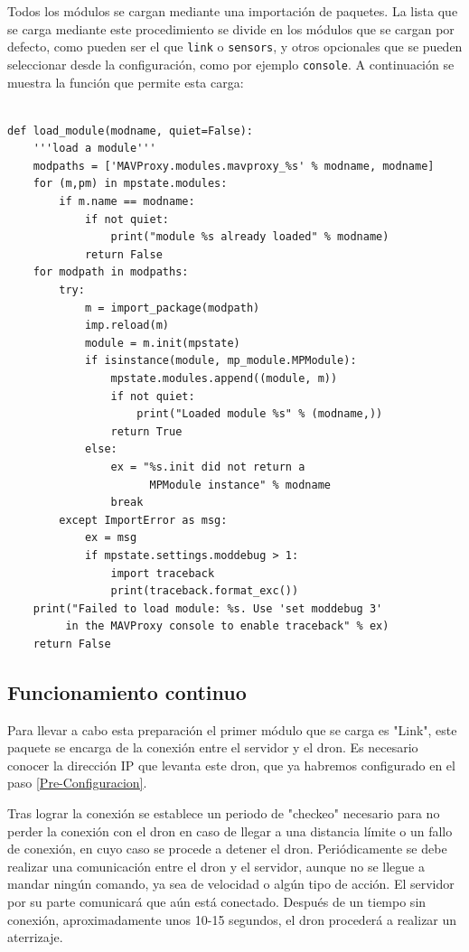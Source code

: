 Todos los módulos se cargan mediante una importación de paquetes. La lista que se carga mediante este procedimiento se divide en los módulos que se cargan por defecto, como pueden ser el que \texttt{link} o \texttt{sensors}, y otros opcionales que se pueden seleccionar desde la configuración, como por ejemplo \texttt{console}. A continuación se muestra la función que permite esta carga:
\begin{lstlisting}[frame=single]

def load_module(modname, quiet=False):
    '''load a module'''
    modpaths = ['MAVProxy.modules.mavproxy_%s' % modname, modname]
    for (m,pm) in mpstate.modules:
        if m.name == modname:
            if not quiet:
                print("module %s already loaded" % modname)
            return False
    for modpath in modpaths:
        try:
            m = import_package(modpath)
            imp.reload(m)
            module = m.init(mpstate)
            if isinstance(module, mp_module.MPModule):
                mpstate.modules.append((module, m))
                if not quiet:
                    print("Loaded module %s" % (modname,))
                return True
            else:
                ex = "%s.init did not return a 
                      MPModule instance" % modname
                break
        except ImportError as msg:
            ex = msg
            if mpstate.settings.moddebug > 1:
                import traceback
                print(traceback.format_exc())
    print("Failed to load module: %s. Use 'set moddebug 3' 
         in the MAVProxy console to enable traceback" % ex)
    return False
\end{lstlisting}


\subsection{Funcionamiento continuo}

Para llevar a cabo esta preparación el primer módulo que se carga es "Link", este paquete se encarga de la conexión entre el servidor y el dron. Es necesario conocer la dirección IP que levanta este dron, que ya habremos configurado en el paso \ref{Pre-Configuracion}.

Tras lograr la conexión se establece un periodo de "checkeo" necesario para no perder la conexión con el dron en caso de llegar a una distancia límite o un fallo de conexión, en cuyo caso se procede a detener el dron. Periódicamente se debe realizar una comunicación entre el dron y el servidor, aunque no se llegue a mandar ningún comando, ya sea de velocidad o algún tipo de acción. El servidor por su parte comunicará que aún está conectado. Después de un tiempo sin conexión, aproximadamente unos 10-15 segundos, el dron procederá a realizar un aterrizaje. 

